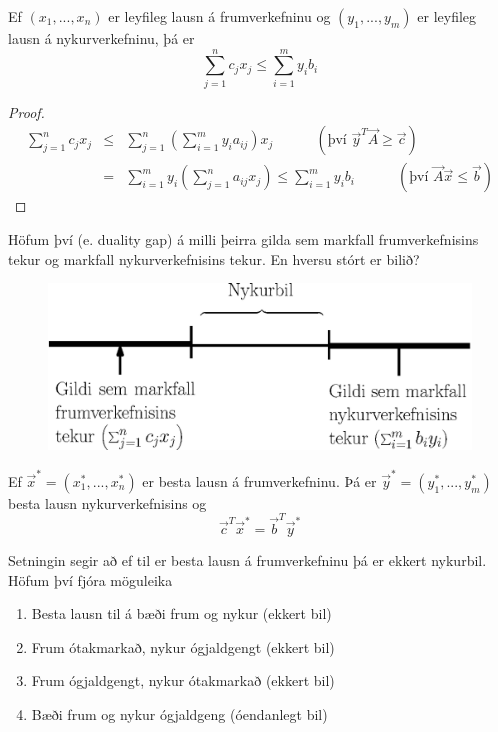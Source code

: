 \begin{setn} Ef $(x_1,...,x_n)$ er leyfileg lausn á frumverkefninu og $(y_1,...,y_m)$ er leyfileg lausn á nykur\-verkefninu, þá er 
$$ \sum_{j=1}^n c_jx_j \leq \sum_{i=1}^m y_ib_i $$ 
\end{setn}
\begin{proof}
\begin{eqnarray*}
 \sum_{j=1}^n c_jx_j &\leq& \sum_{j=1}^n \left(\sum_{i=1}^m y_ia_{ij}\right)x_j \quad\quad\quad(\textrm{því } \vec{y}^T\vec{A}\geq\vec{c})\\
 &=& \sum_{i=1}^m y_i\left(\sum_{j=1}^n a_{ij}x_j\right) \leq \sum_{i=1}^m y_ib_i \quad\quad\quad(\textrm{því } \vec{A}\vec{x}\leq\vec{b})
\end{eqnarray*}
 
\end{proof}
Höfum því  (e. duality gap) á milli þeirra gilda sem markfall frumverkefnisins tekur og markfall nykurverkefnisins tekur. En hversu stórt er bilið?
\begin{figure}[h!]
\centering
 \includegraphics[width=0.6\columnwidth]{figs/nykurbil.eps}
\end{figure}
\begin{setn} Ef $\vec{x}^*=(x_1^*,...,x_n^*)$ er besta lausn á frumverkefninu. Þá er $\vec{y}^*=(y_1^*,...,y_m^*)$ besta lausn nykurverkefnisins og 
$$\vec{c}^T\vec{x}^*=\vec{b}^T\vec{y}^*$$
 \end{setn}
 Setningin segir að ef til er besta lausn á frumverkefninu þá er ekkert nykurbil. 
Höfum því fjóra möguleika
\begin{enumerate}
 \item Besta lausn til á bæði frum og nykur (ekkert bil)
 \item Frum ótakmarkað, nykur ógjaldgengt (ekkert bil)
 \item Frum ógjaldgengt, nykur ótakmarkað (ekkert bil)
 \item Bæði frum og nykur ógjaldgeng (óendanlegt bil)
\end{enumerate}
